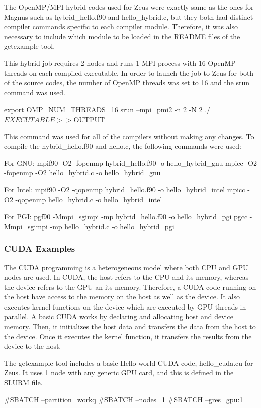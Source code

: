 \documentclass[journal]{IEEEtran}
\begin{document}
The OpenMP/MPI hybrid codes used for Zeus were exactly same as the ones for Magnus such as hybrid_hello.f90 and hello_hybrid.c, but they both had
distinct compiler commands specific to each compiler module. Therefore, it was also necessary to include which module to be loaded in the README files
of the getexample tool.

This hybrid job requires 2 nodes and runs 1 MPI process with 16 OpenMP threads on each compiled executable. In order to launch the job to Zeus for both 
of the source codes, the number of OpenMP threads was set to 16 and the srun command was used.

export OMP_NUM_THREADS=16
srun --mpi=pmi2 -n 2 -N 2 ./$EXECUTABLE >> ${OUTPUT}

This command was used for all of the compilers without making any changes. To compile the hybrid_hello.f90 and hello.c, the following commands were used:

For GNU:
mpif90 -O2 -fopenmp hybrid_hello.f90 -o hello_hybrid_gnu
mpicc -O2 -fopenmp -O2 hello_hybrid.c -o hello_hybrid_gnu

For Intel:
mpif90 -O2 -qopenmp hybrid_hello.f90 -o hello_hybrid_intel
mpicc -O2 -qopenmp hello_hybrid.c -o hello_hybrid_intel

For PGI:
pgf90 -Mmpi=sgimpi -mp hybrid_hello.f90 -o hello_hybrid_pgi
pgcc -Mmpi=sgimpi -mp hello_hybrid.c -o hello_hybrid_pgi

\subsubsection{CUDA Examples}

The CUDA programming is a heterogeneous model where both CPU and GPU nodes are used. In CUDA, the host refers to the CPU and its memory, whereas the 
device refers to the GPU an its memory. Therefore, a CUDA code running on the host have access to the memory on the host as well as the device. It also 
executes kernel functions on the device which are executed by GPU threads in parallel. A basic CUDA works by declaring and allocating host and device 
memory. Then, it initializes the host data and transfers the data from the host to the device. Once it executes the kernel function, it transfers the 
results from the device to the host.

The getexample tool includes a basic Hello world CUDA code, hello_cuda.cu for Zeus. It uses 1 node with any generic GPU card, and this is defined in the 
SLURM file.

#SBATCH --partition=workq
#SBATCH --nodes=1
#SBATCH --gres=gpu:1
\end{document}
